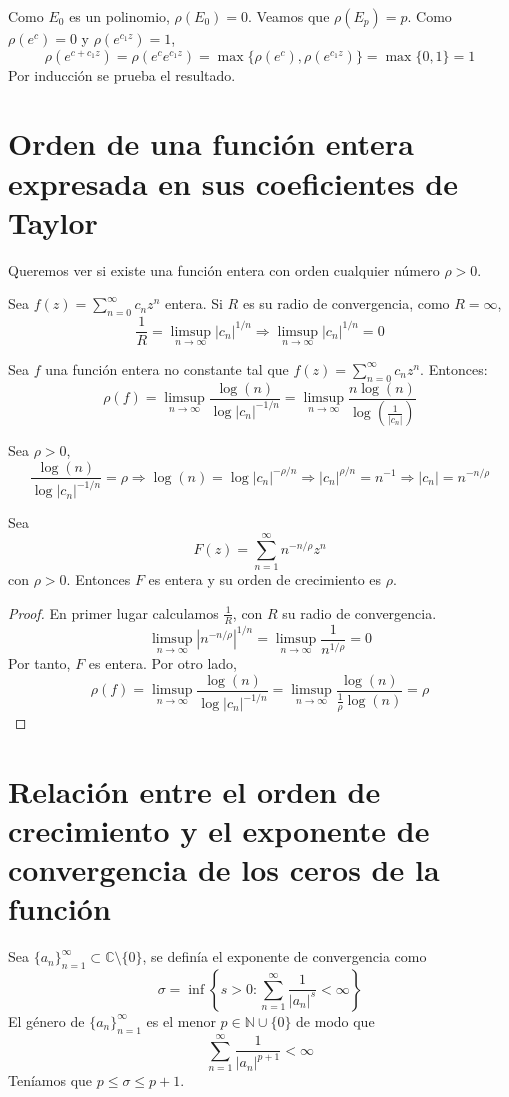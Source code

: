 Como $E_0$ es un polinomio, $\rho(E_0) = 0$.
Veamos que $\rho(E_p) = p$.
Como $\rho(e^c) = 0$ y $\rho(e^{c_1z}) = 1$,
$$\rho(e^{c+c_1z}) = \rho(e^ce^{c_1z}) = \max\{\rho(e^c), \rho(e^{c_1z})\} = \max\{0, 1\} = 1$$
Por inducción se prueba el resultado.

\section{Orden de una función entera expresada en sus coeficientes de Taylor}
Queremos ver si existe una función entera con orden cualquier número $\rho > 0$.

Sea $f(z) = \sum_{n=0}^\infty c_nz^n$ entera.
Si $R$ es su radio de convergencia, como $R = \infty$,
$$\frac{1}{R} = \limsup_{n \to \infty} |c_n|^{1/n} \Rightarrow \limsup_{n \to \infty} |c_n|^{1/n} = 0$$

\begin{theorem}
    Sea $f$ una función entera no constante tal que $f(z) = \sum_{n=0}^\infty c_nz^n$.
    Entonces:
    $$\rho(f) = \limsup_{n \to \infty} \frac{\log(n)}{\log|c_n|^{-1/n}} = \limsup_{n \to \infty} \frac{n\log(n)}{\log\left(\frac{1}{|c_n|}\right)}$$
\end{theorem}


Sea $\rho > 0$,
$$\frac{\log(n)}{\log|c_n|^{-1/n}} = \rho \Rightarrow \log(n) = \log|c_n|^{-\rho/n} \Rightarrow |c_n|^{\rho/n} = n^{-1} \Rightarrow |c_n| = n^{-n/\rho}$$

\begin{corollary}
    Sea
    $$F(z) = \sum_{n=1}^\infty n^{-n/\rho}z^n$$
    con $\rho > 0$.
    Entonces $F$ es entera y su orden de crecimiento es $\rho$.
\end{corollary}

\begin{proof}
    En primer lugar calculamos $\frac{1}{R}$, con $R$ su radio de convergencia.
    $$\limsup_{n \to \infty} |n^{-n/\rho}|^{1/n} = \limsup_{n \to \infty} \frac{1}{n^{1/\rho}} = 0$$
    Por tanto, $F$ es entera.
    Por otro lado,
    $$\rho(f) = \limsup_{n \to \infty} \frac{\log(n)}{\log|c_n|^{-1/n}} = \limsup_{n \to \infty} \frac{\log(n)}{\frac{1}{\rho}\log(n)} = \rho$$
\end{proof}

\section{Relación entre el orden de crecimiento y el exponente de convergencia de los ceros de la función}
Sea $\{a_n\}_{n=1}^\infty \subset \mathbb{C} \setminus \{0\}$, se definía el exponente de convergencia como
$$\sigma = \inf\left\{s > 0 : \sum_{n=1}^\infty \frac{1}{|a_n|^s} < \infty\right\}$$
El género de $\{a_n\}_{n=1}^\infty$ es el menor $p \in \mathbb{N} \cup \{0\}$ de modo que
$$\sum_{n=1}^\infty \frac{1}{|a_n|^{p+1}} < \infty$$
Teníamos que $p \leq \sigma \leq p+1$.

